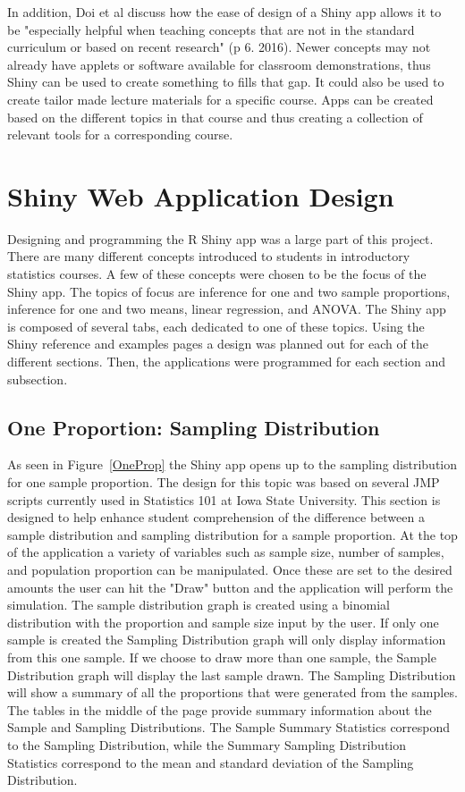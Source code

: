 \documentclass[11pt]{book}
\begin{document}
 In addition, Doi et al discuss how the ease of design of a Shiny app allows it to be "especially helpful when teaching concepts that are not in the standard curriculum or based on recent research" (p 6. 2016).  Newer concepts may not already have applets or software available for classroom demonstrations, thus Shiny can be used to create something to fills that gap.  It could also be used to create tailor made lecture materials for a specific course.  Apps can be created based on the different topics in that course and thus creating a collection of relevant tools for a corresponding course. 
 

\section{Shiny Web Application Design}
Designing and programming the R Shiny app was a large part of this project. There are many different concepts introduced to students in introductory statistics courses.  A few of these concepts were chosen to be the focus of the Shiny app.  The topics of focus are inference for one and two sample proportions, inference for one and two means, linear regression, and ANOVA.  The Shiny app is composed of several tabs, each dedicated to one of these topics. Using the Shiny reference and examples pages a design was planned out for each of the different sections. Then, the applications were programmed for each section and subsection. 


\subsection{One Proportion: Sampling Distribution}
As seen in Figure~\ref{OneProp} the Shiny app opens up to the sampling distribution for one sample proportion.  The design for this topic was based on several JMP scripts currently used in Statistics 101 at Iowa State University.  This section is designed to help enhance student comprehension of the difference between a sample distribution and sampling distribution for a sample proportion. At the top of the application a variety of variables such as sample size, number of samples, and population proportion can be manipulated.  Once these are set to the desired amounts the user can hit the "Draw" button and the application will perform the simulation. 
  The sample distribution graph is created using a binomial distribution with the proportion and sample size input by the user. If only one sample is created the Sampling Distribution graph will only display information from this one sample. If we choose to draw more than one sample, the Sample Distribution graph will display the last sample drawn. The Sampling Distribution will show a summary of all the proportions that were generated from the samples.  The tables in the middle of the page provide summary information about the Sample and Sampling Distributions. The Sample Summary Statistics correspond to the Sampling Distribution, while the  Summary Sampling Distribution Statistics correspond to the mean and standard deviation of the Sampling Distribution. 
  
\end{document}
